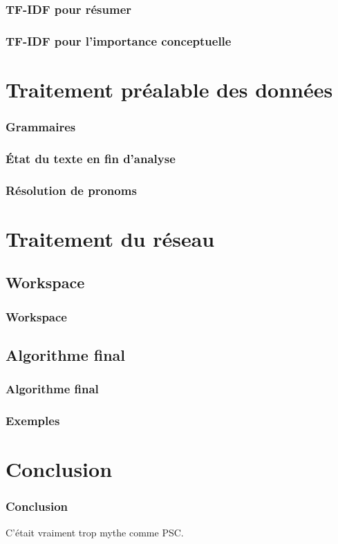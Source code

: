 \documentclass[12pt, handout]{beamer}
\begin{document}
\begin{frame}
 \frametitle{TF-IDF pour résumer}
 
 
\end{frame}


\begin{frame}
 \frametitle{TF-IDF pour l'importance conceptuelle}
 
 
\end{frame}


\section{Traitement préalable des données}


\begin{frame}
 \frametitle{Grammaires}
 
 
\end{frame}

\begin{frame}
 \frametitle{État du texte en fin d'analyse}
 
 
\end{frame}


\begin{frame}[allowframebreaks = 0.7]
 \frametitle{Résolution de pronoms}
 
 
\end{frame}


\section{Traitement du réseau}

\subsection{Workspace}

\begin{frame}
 \frametitle{Workspace}
 
 
\end{frame}

\begin{frame}
 \frametitle{}
 
 
\end{frame}

\subsection{Algorithme final}

\begin{frame}
 \frametitle{Algorithme final}
 
 
\end{frame}

\begin{frame}
 \frametitle{Exemples}
 
 
\end{frame}

\section{Conclusion}

\begin{frame}
 \frametitle{Conclusion}
 
C'était vraiment trop mythe comme PSC.
 
\end{frame}
\end{document}
